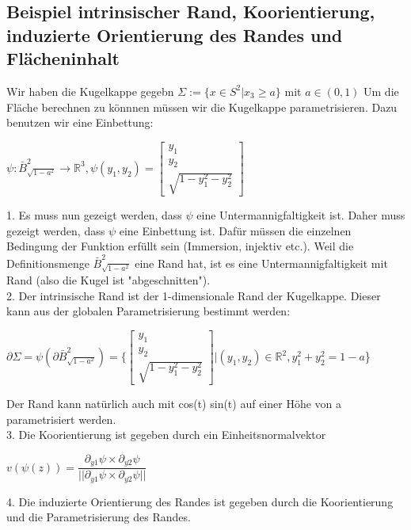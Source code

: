 \documentclass[a4paper, fontsize = 8pt, landscape]{scrartcl}
\newcommand{\R}[0]{\mathbb{R}}
\begin{document}
\begin{multicols*}{3}
    \subsection{Beispiel intrinsischer Rand, Koorientierung, induzierte Orientierung des Randes und Flächeninhalt}

    Wir haben die Kugelkappe gegebn $\Sigma := \{x \in S^2 | x_3 \geq a\}$ mit $a \in (0,1)$
    Um die Fläche berechnen zu könnnen müssen wir die Kugelkappe parametrisieren. Dazu benutzen wir eine Einbettung:
    \begin{center}
        $\psi: \bar{B}^2_{\sqrt{1-a^2}} \rightarrow \R^3, \psi(y_1, y_2)=\begin{bmatrix*}
                y_1 \\ y_2 \\ \sqrt{1-y_1^2-y_2^2}
            \end{bmatrix*}$
    \end{center}
    1. Es muss nun gezeigt werden, dass $\psi$ eine Untermannigfaltigkeit ist. Daher muss gezeigt werden, dass $\psi$ eine Einbettung ist. Dafür müssen die einzelnen Bedingung der Funktion erfüllt sein (Immersion, injektiv etc.). Weil die Definitionsmenge $\bar{B}^2_{\sqrt{1-a^2}}$ eine Rand hat, ist es eine Untermannigfaltigkeit mit Rand (also die Kugel ist "abgeschnitten"). \\
    2. Der intrinsische Rand ist der 1-dimensionale Rand der Kugelkappe. Dieser kann aus der globalen Parametrisierung bestimmt werden:
    \begin{center}
        $\partial\Sigma = \psi(\partial \bar{B}^2_{\sqrt{1-a^2}})=\{\begin{bmatrix}
                y_1 \\ y_2 \\ \sqrt{1-y_1^2-y_2^2}
            \end{bmatrix} | (y_1, y_2) \in \R^2, y_1^2+y_2^2=1-a$\}
    \end{center}
    Der Rand kann natürlich auch mit cos(t) sin(t) auf einer Höhe von a parametrisiert werden. \\
    3. Die Koorientierung ist gegeben durch ein Einheitsnormalvektor
    \begin{center}
        $v(\psi(z)) = \dfrac{\partial_{y1} \psi \times \partial_{y2} \psi}{|| \partial_{y1} \psi \times \partial_{y2} \psi ||}$
    \end{center}
    4. Die induzierte Orientierung des Randes ist gegeben durch die Koorientierung und die Parametrisierung des Randes.
    \begin{center}

\end{center}
\end{multicols*}
\end{document}
